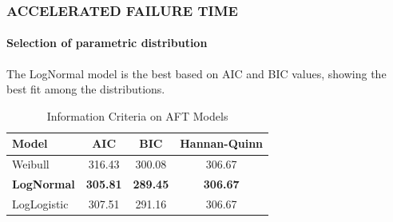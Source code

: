 \documentclass[12pt]{beamer}
\begin{document}
	\begin{frame}
 		\frametitle{ACCELERATED FAILURE TIME}
   \framesubtitle{Selection of parametric distribution}
            \begin{block}{}
The LogNormal model is the best based on AIC and BIC values, showing the best fit among the distributions.
\end{block}

  \begin{table}[H]
        \centering
        \begin{tabular}{lccc}
            \hline
            Model & AIC & BIC & Hannan-Quinn \\
            \hline
            Weibull & 316.43 & 300.08 & 306.67 \\
            \textbf{LogNormal} & \textbf{305.81} & \textbf{289.45} & \textbf{306.67} \\
            LogLogistic & 307.51 & 291.16 & 306.67 \\
            \hline
        \end{tabular}
        \caption{Information Criteria on AFT Models}
        \label{tab:model_comparison}
    \end{table}

    \end{frame}
	
\end{document}
